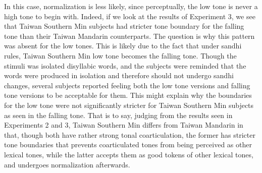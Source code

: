 In this case, normalization is less likely, since perceptually, the low tone is never a high tone to begin with. Indeed, if we look at the results of Experiment 3, we see that Taiwan Southern Min subjects had stricter tone boundary for the falling tone than their Taiwan Mandarin counterparts. The question is why this pattern was absent for the low tones. This is likely due to the fact that under sandhi rules, Taiwan Southern Min low tone becomes the falling tone. Though the stimuli was isolated disyllabic words, and the subjects were reminded that the words were produced in isolation and therefore should not undergo sandhi changes, several subjects reported feeling both the low tone versions and falling tone versions to be acceptable for them. This might explain why the boundaries for the low tone were not significantly stricter for Taiwan Southern Min subjects as seen in the falling tone. That is to say, judging from the results seen in Experiments 2 and 3, Taiwan Southern Min differs from Taiwan Mandarin in that, though both have rather strong tonal coarticulation, the former has stricter tone boundaries that prevents coarticulated tones from being perceived as other lexical tones, while the latter accepts them as good tokens of other lexical tones, and undergoes normalization afterwards.

